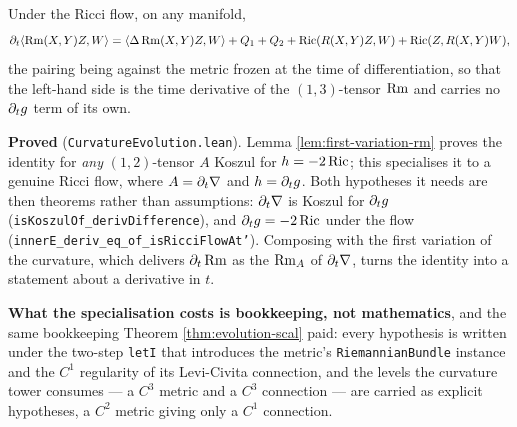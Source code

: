 \begin{theorem}
  \label{thm:evolution-rm}
  \leanok
  Under the Ricci flow, on any manifold,
  \[
    \partial_t \langle \operatorname{Rm}(X,Y)Z, W\rangle = \langle \Delta\operatorname{Rm}(X,Y)Z, W\rangle
      + Q_1 + Q_2 + \operatorname{Ric}(R(X,Y)Z,W) + \operatorname{Ric}(Z,R(X,Y)W),
  \]
  the pairing being against the metric frozen at the time of differentiation, so
  that the left-hand side is the time derivative of the $(1,3)$-tensor $\operatorname{Rm}$ and
  carries no $\partial_tg$ term of its own.

  \textbf{Proved} (\texttt{CurvatureEvolution.lean}). Lemma
  \ref{lem:first-variation-rm} proves the identity for \emph{any} $(1,2)$-tensor
  $A$ Koszul for $h = -2\operatorname{Ric}$; this specialises it to a genuine Ricci flow, where
  $A = \partial_t\nabla$ and $h = \partial_tg$. Both hypotheses it needs are then
  theorems rather than assumptions: $\partial_t\nabla$ is Koszul for $\partial_tg$
  (\texttt{isKoszulOf\_derivDifference}), and $\partial_tg = -2\operatorname{Ric}$ under the
  flow (\texttt{innerE\_deriv\_eq\_of\_isRicciFlowAt'}). Composing with the first
  variation of the curvature, which delivers $\partial_t\operatorname{Rm}$ as the $\operatorname{Rm}_A$ of
  $\partial_t\nabla$, turns the identity into a statement about a derivative in
  $t$.

  \textbf{What the specialisation costs is bookkeeping, not mathematics}, and the
  same bookkeeping Theorem \ref{thm:evolution-scal} paid: every hypothesis is
  written under the two-step \texttt{letI} that introduces the metric's
  \texttt{RiemannianBundle} instance and the $C^1$ regularity of its Levi-Civita
  connection, and the levels the curvature tower consumes --- a $C^3$ metric and a
  $C^3$ connection --- are carried as explicit hypotheses, a $C^2$ metric giving
  only a $C^1$ connection.
\end{theorem}

